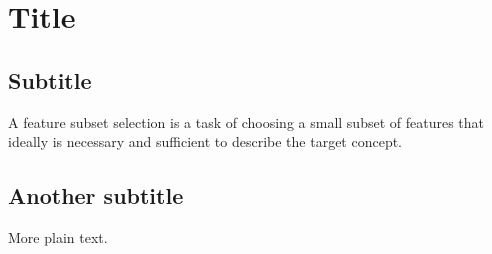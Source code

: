 \documentclass{article}
\begin{document}
\section{Title}

\subsection{Subtitle}

A feature subset selection is a task of choosing a small subset of
features that ideally is necessary and sufficient to describe the target concept.

\subsection{Another subtitle}

More plain text.
\end{document}
